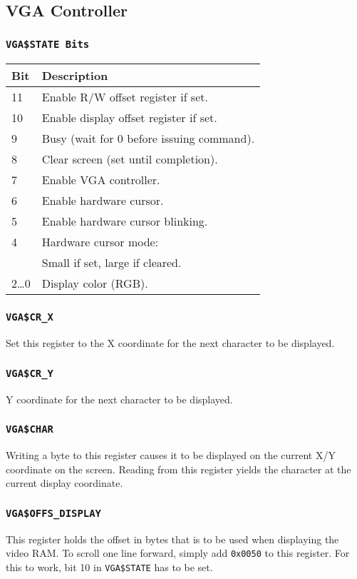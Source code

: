 \documentclass{leaflet}
\begin{document}
  \subsection{VGA Controller}
   \subsubsection{\texttt{VGA\$STATE Bits}}
    \begin{center}
     \begin{longtable}{|l|l|}
      \hline
      Bit&Description\\
      \hline
      11&Enable R/W offset register if set.\\
      10&Enable display offset register if set.\\
      9&Busy (wait for 0 before issuing command).\\
      8&Clear screen (set until completion).\\
      7&Enable VGA controller.\\
      6&Enable hardware cursor.\\
      5&Enable hardware cursor blinking.\\
      4&Hardware cursor mode:\\
       &Small if set, large if cleared.\\
      2\dots 0&Display color (RGB).\\
      \hline
     \end{longtable}
    \end{center}
   \subsubsection{\texttt{VGA\$CR\_X}}
    Set this register to the X coordinate for the next character to be 
    displayed.
   \subsubsection{\texttt{VGA\$CR\_Y}}
    Y coordinate for the next character to be displayed.
   \subsubsection{\texttt{VGA\$CHAR}}
    Writing a byte to this register causes it to be displayed on the current
    X/Y coordinate on the screen. Reading from this register yields the 
    character at the current display coordinate.
   \subsubsection{\texttt{VGA\$OFFS\_DISPLAY}}
    This register holds the offset in bytes that is to be used when displaying
    the video RAM. To scroll one line forward, simply add \texttt{0x0050} to 
    this register. For this to work, bit 10 in \texttt{VGA\$STATE} has to be
    set.
\end{document}
